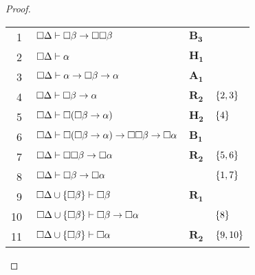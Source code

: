 \begin{tcolorbox}[enhanced jigsaw, breakable, sharp corners, colframe=black, colback=white, boxrule=0.5pt, left=1.5mm, right=1.5mm, top=1.5mm, bottom=1.5mm]
\begin{theorem}
\begin{proof}
            \vspace{0.5\baselineskip}
            \footnotesize
            \setlength{\rowskip}{0.5\baselineskip}
            \begin{xltabular}{\textwidth}{r | X l l}
                \scriptsize{\phantom{0}1}\phantom{ } & $\ \nec\Delta\vdash\nec\beta\to\nec\nec\beta$                             & $\hyperref[modal.axiom.modal.3]{\mathbf{B_3}}$ & \\[\rowskip]
                \scriptsize{\phantom{0}2}\phantom{ } & $\ \nec\Delta\vdash\alpha$                                                & $\mathbf{H_1}$\phantom{1}                      & \\[\rowskip]
                \scriptsize{\phantom{0}3}\phantom{ } & $\ \nec\Delta\vdash\alpha\to\nec\beta\to\alpha$                           & $\hyperref[modal.axiom.1]{\mathbf{A_1}}$       & \\[\rowskip]
                \scriptsize{\phantom{0}4}\phantom{ } & $\ \nec\Delta\vdash\nec\beta\to\alpha$                                    & $\hyperref[modal.rule.2]{\mathbf{R_2}}$        & $\left\{2,3\right\}$\\[\rowskip]
                \scriptsize{\phantom{0}5}\phantom{ } & $\ \nec\Delta\vdash\nec(\nec\beta\to\alpha)$                              & $\mathbf{H_2}$                                 & $\left\{4\right\}$\\[\rowskip]
                \scriptsize{\phantom{0}6}\phantom{ } & $\ \nec\Delta\vdash\nec(\nec\beta\to\alpha)\to\nec\nec\beta\to\nec\alpha$ & $\hyperref[modal.axiom.modal.1]{\mathbf{B_1}}$ & \\[\rowskip]
                \scriptsize{\phantom{0}7}\phantom{ } & $\ \nec\Delta\vdash\nec\nec\beta\to\nec\alpha$                            & $\hyperref[modal.rule.2]{\mathbf{R_2}}$        & $\left\{5,6\right\}$\\[\rowskip]
                \scriptsize{\phantom{0}8}\phantom{ } & $\ \nec\Delta\vdash\nec\beta\to\nec\alpha$                                &                          & $\left\{1,7\right\}$\\[\rowskip]
                \scriptsize{\phantom{0}9}\phantom{ } & $\ \nec\Delta\cup\set{\nec\beta}\vdash\nec\beta$                          & $\hyperref[modal.rule.2]{\mathbf{R_1}}$        & \\[\rowskip]
                \scriptsize{10}\phantom{ }           & $\ \nec\Delta\cup\set{\nec\beta}\vdash\nec\beta\to\nec\alpha$             &                            & $\left\{8\right\}$\\[\rowskip]
                \scriptsize{11}\phantom{ }           & $\ \nec\Delta\cup\set{\nec\beta}\vdash\nec\alpha$                         & $\hyperref[modal.rule.2]{\mathbf{R_2}}$  & $\left\{9,10\right\}$
            \end{xltabular}
            \normalsize


\end{proof}
\end{theorem}
\end{tcolorbox}
